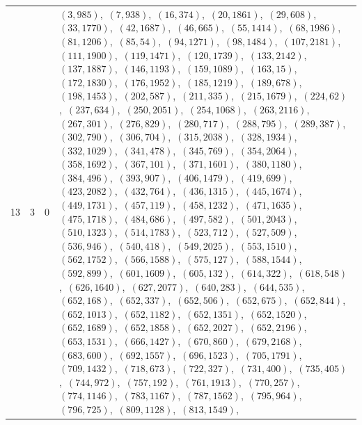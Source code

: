 \documentclass[11pt]{article}
\begin{document}
\begin{longtable}{@{}rrl>{\raggedright\arraybackslash}p{}@{}}
13 & 3 & $0$ & $(3,985)$,\allowbreak\ $(7,938)$,\allowbreak\ $(16,374)$,\allowbreak\ $(20,1861)$,\allowbreak\ $(29,608)$,\allowbreak\ $(33,1770)$,\allowbreak\ $(42,1687)$,\allowbreak\ $(46,665)$,\allowbreak\ $(55,1414)$,\allowbreak\ $(68,1986)$,\allowbreak\ $(81,1206)$,\allowbreak\ $(85,54)$,\allowbreak\ $(94,1271)$,\allowbreak\ $(98,1484)$,\allowbreak\ $(107,2181)$,\allowbreak\ $(111,1900)$,\allowbreak\ $(119,1471)$,\allowbreak\ $(120,1739)$,\allowbreak\ $(133,2142)$,\allowbreak\ $(137,1887)$,\allowbreak\ $(146,1193)$,\allowbreak\ $(159,1089)$,\allowbreak\ $(163,15)$,\allowbreak\ $(172,1830)$,\allowbreak\ $(176,1952)$,\allowbreak\ $(185,1219)$,\allowbreak\ $(189,678)$,\allowbreak\ $(198,1453)$,\allowbreak\ $(202,587)$,\allowbreak\ $(211,335)$,\allowbreak\ $(215,1679)$,\allowbreak\ $(224,62)$,\allowbreak\ $(237,634)$,\allowbreak\ $(250,2051)$,\allowbreak\ $(254,1068)$,\allowbreak\ $(263,2116)$,\allowbreak\ $(267,301)$,\allowbreak\ $(276,829)$,\allowbreak\ $(280,717)$,\allowbreak\ $(288,795)$,\allowbreak\ $(289,387)$,\allowbreak\ $(302,790)$,\allowbreak\ $(306,704)$,\allowbreak\ $(315,2038)$,\allowbreak\ $(328,1934)$,\allowbreak\ $(332,1029)$,\allowbreak\ $(341,478)$,\allowbreak\ $(345,769)$,\allowbreak\ $(354,2064)$,\allowbreak\ $(358,1692)$,\allowbreak\ $(367,101)$,\allowbreak\ $(371,1601)$,\allowbreak\ $(380,1180)$,\allowbreak\ $(384,496)$,\allowbreak\ $(393,907)$,\allowbreak\ $(406,1479)$,\allowbreak\ $(419,699)$,\allowbreak\ $(423,2082)$,\allowbreak\ $(432,764)$,\allowbreak\ $(436,1315)$,\allowbreak\ $(445,1674)$,\allowbreak\ $(449,1731)$,\allowbreak\ $(457,119)$,\allowbreak\ $(458,1232)$,\allowbreak\ $(471,1635)$,\allowbreak\ $(475,1718)$,\allowbreak\ $(484,686)$,\allowbreak\ $(497,582)$,\allowbreak\ $(501,2043)$,\allowbreak\ $(510,1323)$,\allowbreak\ $(514,1783)$,\allowbreak\ $(523,712)$,\allowbreak\ $(527,509)$,\allowbreak\ $(536,946)$,\allowbreak\ $(540,418)$,\allowbreak\ $(549,2025)$,\allowbreak\ $(553,1510)$,\allowbreak\ $(562,1752)$,\allowbreak\ $(566,1588)$,\allowbreak\ $(575,127)$,\allowbreak\ $(588,1544)$,\allowbreak\ $(592,899)$,\allowbreak\ $(601,1609)$,\allowbreak\ $(605,132)$,\allowbreak\ $(614,322)$,\allowbreak\ $(618,548)$,\allowbreak\ $(626,1640)$,\allowbreak\ $(627,2077)$,\allowbreak\ $(640,283)$,\allowbreak\ $(644,535)$,\allowbreak\ $(652,168)$,\allowbreak\ $(652,337)$,\allowbreak\ $(652,506)$,\allowbreak\ $(652,675)$,\allowbreak\ $(652,844)$,\allowbreak\ $(652,1013)$,\allowbreak\ $(652,1182)$,\allowbreak\ $(652,1351)$,\allowbreak\ $(652,1520)$,\allowbreak\ $(652,1689)$,\allowbreak\ $(652,1858)$,\allowbreak\ $(652,2027)$,\allowbreak\ $(652,2196)$,\allowbreak\ $(653,1531)$,\allowbreak\ $(666,1427)$,\allowbreak\ $(670,860)$,\allowbreak\ $(679,2168)$,\allowbreak\ $(683,600)$,\allowbreak\ $(692,1557)$,\allowbreak\ $(696,1523)$,\allowbreak\ $(705,1791)$,\allowbreak\ $(709,1432)$,\allowbreak\ $(718,673)$,\allowbreak\ $(722,327)$,\allowbreak\ $(731,400)$,\allowbreak\ $(735,405)$,\allowbreak\ $(744,972)$,\allowbreak\ $(757,192)$,\allowbreak\ $(761,1913)$,\allowbreak\ $(770,257)$,\allowbreak\ $(774,1146)$,\allowbreak\ $(783,1167)$,\allowbreak\ $(787,1562)$,\allowbreak\ $(795,964)$,\allowbreak\ $(796,725)$,\allowbreak\ $(809,1128)$,\allowbreak\ $(813,1549)$,\allowbreak\ 
\end{longtable}
\end{document}
